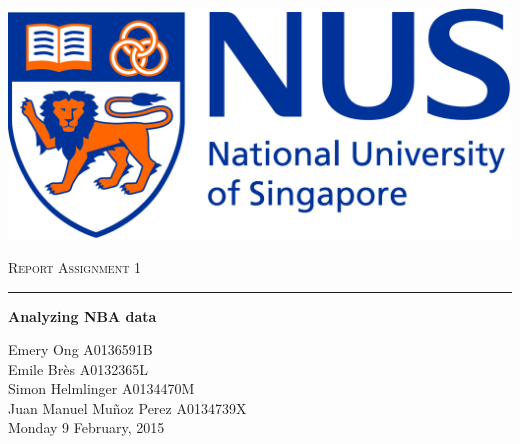 
\begin{center}
	\begin{flushleft}
		\includegraphics[scale=0.1]{images/NUS.jpg}
		
	\end{flushleft}
	
	
	\vskip 5cm
	{\LARGE\textsc{Report Assignment 1}}\\
	\noindent\rule{4cm}{0.2pt}
	\vskip 0.5cm
	{\LARGE\textbf{Analyzing NBA data}}
	\vskip 4.5cm
	
	\LARGE{Emery Ong A0136591B}\\
	\LARGE{Emile Br\`es A0132365L}\\
	\LARGE{Simon Helmlinger A0134470M}\\
	\LARGE{Juan Manuel Mu\~noz Perez A0134739X}\\
	
	\vspace{1.0cm}
	\Large{Monday 9 February, 2015}
	
	\vspace{2.cm}
	
\end{center}
